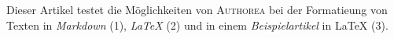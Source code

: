 Dieser Artikel testet die Möglichkeiten von \textsc{Authorea} bei der Formatieung von Texten in \emph{Markdown} (1), \emph{LaTeX} (2) und in einem \textit{Beispielartikel} in LaTeX (3).
